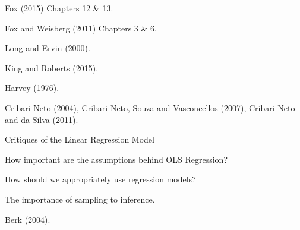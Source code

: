 \documentclass[letterpaper]{article}
\renewenvironment{itemize}{
  \begin{list}{}{
    \setlength{\leftmargin}{1.5em}
  }
}{
  \end{list}
}
\begin{document}
\begin{enumerate}
			\begin{itemize}
				\item[$\star$] Fox (2015) Chapters 12 \& 13.
				\item[$\star$] Fox and Weisberg (2011) Chapters 3 \& 6.
				\item[$\star$] Long and Ervin (2000).
				\item[$\star$] King and Roberts (2015).
				\item[-] Harvey (1976).
				\item[-] Cribari-Neto (2004), Cribari-Neto, Souza and Vasconcellos (2007), Cribari-Neto and da Silva (2011).
			\end{itemize}



	\item Critiques of the Linear Regression Model

			\begin{itemize}
				\item[$\square$] How important are the assumptions behind OLS Regression? 
				\item[$\square$] How should we appropriately use regression models?
				\item[$\square$] The importance of sampling to inference.
			\end{itemize}



			\begin{itemize}
				\item[$\star$] Berk (2004).
			\end{itemize}


\end{enumerate}









%
%
\end{document}
